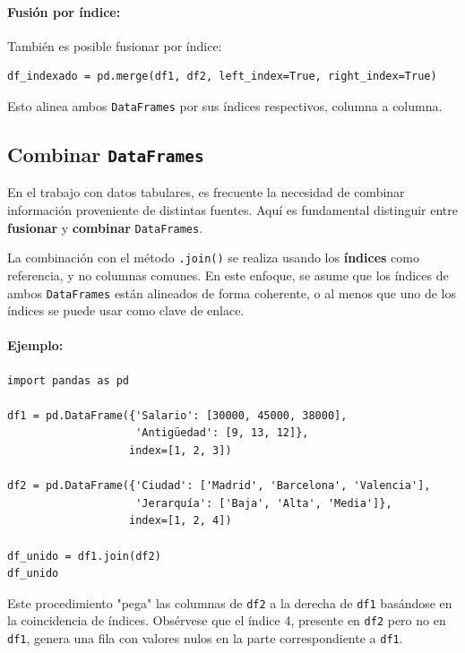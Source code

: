 \documentclass{article}
\theoremstyle{nonumberplain}
\begin{document}
\paragraph{Fusión por índice:}

También es posible fusionar por índice:

\begin{verbatim}
df_indexado = pd.merge(df1, df2, left_index=True, right_index=True)
\end{verbatim}

Esto alinea ambos \texttt{DataFrames} por sus índices respectivos, columna a columna.

\subsection*{Combinar \texttt{DataFrames}}

En el trabajo con datos tabulares, es frecuente la necesidad de combinar información proveniente de distintas fuentes. Aquí es fundamental distinguir entre \textbf{fusionar} y \textbf{combinar} \texttt{DataFrames}.

La combinación con el método \texttt{.join()} se realiza usando los \textbf{índices} como referencia, y no columnas comunes. En este enfoque, se asume que los índices de ambos \texttt{DataFrames} están alineados de forma coherente, o al menos que uno de los índices se puede usar como clave de enlace.

\paragraph{Ejemplo:}

\begin{verbatim}
import pandas as pd

df1 = pd.DataFrame({'Salario': [30000, 45000, 38000],
                    'Antigüedad': [9, 13, 12]},
                   index=[1, 2, 3])

df2 = pd.DataFrame({'Ciudad': ['Madrid', 'Barcelona', 'Valencia'],
                    'Jerarquía': ['Baja', 'Alta', 'Media']},
                   index=[1, 2, 4])

df_unido = df1.join(df2)
df_unido
\end{verbatim}

Este procedimiento "pega" las columnas de \texttt{df2} a la derecha de \texttt{df1} basándose en la coincidencia de índices. Obsérvese que el índice 4, presente en \texttt{df2} pero no en \texttt{df1}, genera una fila con valores nulos en la parte correspondiente a \texttt{df1}.
\end{document}
